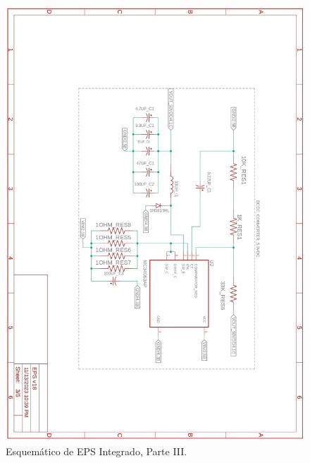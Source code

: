 \begin{figure}[h]
  \centering
  \includegraphics[width=\textwidth]{Pictures/EPS_Sheets_page-0003.jpg}
  \caption{Esquemático de EPS Integrado, Parte III.}
  \label{fig:EPS_Sheet3}
\end{figure}

